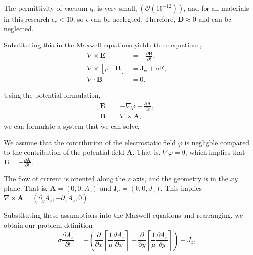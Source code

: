 \begin{assumption}
    The permittivity of vacuum $\epsilon_0$ is very small, $(\mathcal{O}(10^{-12}))$, and for all materials in this research $\epsilon_r < 10$, so $\epsilon$ can be neclegted. Therefore, $\mathbf{D} \approx 0$ and can be neglected.
\end{assumption}

\noindent Substituting this in the Maxwell equations yields three equations,
\begin{align*}
    \nabla \times \mathbf{E} &= -\frac{\partial \mathbf{B}}{\partial t}, \\
    \nabla \times \left[\mu^{-1}\mathbf{B}\right] &=  \mathbf{J_e} + \sigma \mathbf{E}, \\
    \nabla \cdot \mathbf{B} &= 0.
\end{align*}

\noindent Using the potential formulation,
\begin{align*}
    \mathbf{E} &= -\nabla \varphi -\frac{\partial \mathbf{A}}{\partial t}, \\
    \mathbf{B} &= \nabla \times \mathbf A,
\end{align*}
we can formulate a system that we can solve.

\begin{assumption}
    We assume that the contribution of the electrostatic field $\varphi$ is negligble compared to the contribution of the potential field $\mathbf A$. That is, $\nabla \varphi = 0$, which implies that $\mathbf{E} = -\frac{\partial \mathbf{A}}{\partial t}$.
\end{assumption}

\begin{assumption}
    The flow of current is oriented along the $z$ axis, and the geometry is in the $xy$ plane. That is, $\mathbf{A} = (0, 0, A_z)$ and $\mathbf{J_e} = (0, 0, J_z)$. This implies $\nabla \times \mathbf A = (\partial_y A_z, -\partial_x A_z,0)$.
\end{assumption}

\noindent Substituting these assumptions into the Maxwell equations and rearranging, we obtain our problem definition.
\begin{equation*}
    \sigma\frac{\partial A_z}{\partial t} = - \left(\frac{\partial}{\partial x}\left[\frac{1}{\mu} \frac{\partial A_z}{\partial x}\right] + \frac{\partial}{\partial y}\left[\frac{1}{\mu} \frac{\partial A_z}{\partial y}\right]\right) + J_z,
\end{equation*}

